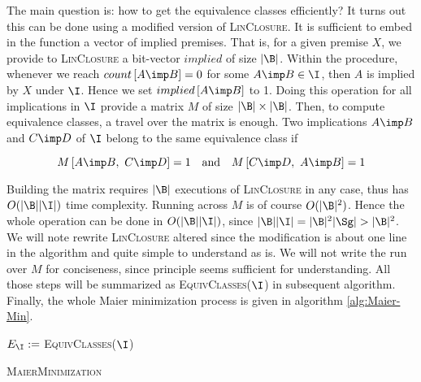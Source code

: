 \vspace{1.2em}

The main question is: how to get the equivalence classes efficiently? It turns
out this can be done using a modified version of \textsc{LinClosure}. It is 
sufficient to embed in the function a vector of implied premises. That is, 
for a given premise $X$, we provide to \textsc{LinClosure} a bit-vector 
$implied$ of size $|\B|$. Within the procedure, whenever we reach $count\left[A \imp B \right] = 0$ for some $A \imp B \in \I$, then $A$ is implied by $X$ under $\I$. Hence we set $implied\left[ A \imp B\right]$ to 1. Doing this operation for all implications in $\I$ provide a matrix $M$ of size $|\B| \times |\B|$. Then, to compute equivalence classes, a travel over the matrix is enough. Two implications $A \imp B$ and $C \imp D$ of $\I$ belong to the same equivalence class if 

\[ M\left[A \imp B, \ C \imp D \right] = 1 \quad \text{and} \quad 
M\left[C \imp D, \ A \imp B \right] = 1 \]

\noindent Building the matrix requires $|\B|$ executions of \textsc{LinClosure}
in any case, thus has $O(|\B||\I|)$ time complexity. Running across $M$ is 
of course $O(|\B|^2)$. Hence the whole operation can be done in $O(|\B||\I|)$,
since $|\B||\I| = |\B|^2|\Sg| > |\B|^2$. We will note rewrite 
\textsc{LinClosure} altered since the modification is about one line in the 
algorithm and quite simple to understand as is. We will not write the run over 
$M$ for conciseness, since principle seems sufficient for understanding. All 
those steps will be summarized as \textsc{EquivClasses}($\I$) in subsequent 
algorithm. Finally, the whole Maier minimization process is given in algorithm
\ref{alg:Maier-Min}.

\vspace{1.2em}

\begin{algorithm}
	
	\BlankLine
	\BlankLine
	
	
	\BlankLine
	
	$E_{\I} := $ \textsc{EquivClasses}($\I$) \;
	
	\BlankLine
	
	
	\caption{\textsc{MaierMinimization}}
	\label{alg:Maier-Min}
\end{algorithm}

